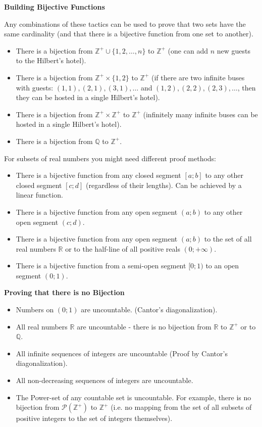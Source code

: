 \documentclass[jou]{apa6}
\begin{document}
{\bf Building Bijective Functions}

Any combinations of these tactics can be used
to prove that two sets have the same cardinality
(and that there is a bijective function from one set to another).

\begin{itemize}
\item There is a bijection from $\mathbb{Z}^{+} \cup \{ 1,2,\ldots,n \}$
to $\mathbb{Z}^{+}$ (one can add $n$ new guests to the Hilbert's hotel). 
\item There is a bijection from $\mathbb{Z}^{+} \times \{ 1,2 \}$
to $\mathbb{Z}^{+}$ (if there are two infinite buses with guests: 
$(1,1),(2,1),(3,1),\ldots$ and $(1,2),(2,2),(2,3),\ldots$, 
then they can be hosted in a single Hilbert's hotel). 
\item There is a bijection from $\mathbb{Z}^{+} \times \mathbb{Z}^{+}$
to $\mathbb{Z}^{+}$ (infinitely many infinite buses can be hosted in a 
single Hilbert's hotel). 
\item There is a bijection from $\mathbb{Q}$ to $\mathbb{Z}^{+}$. 
\end{itemize}

For subsets of real numbers you might need different 
proof methods: 

\begin{itemize}
\item There is a bijective function from any closed 
segment $[a;b]$ to any other closed segment $[c;d]$ 
(regardless of their lengths). Can be achieved by a linear
function. 
\item There is a bijective function from any open 
segment $(a;b)$ to any other open segment $(c;d)$. 
\item There is a bijective function from any open 
segment $(a;b)$ to the set of all real numbers $\mathbb{R}$
or to the half-line of all positive reals $(0;+\infty)$. 
\item There is a bijective function from a 
semi-open segment $[0;1)$ to an open segment $(0;1)$. 
\end{itemize}


{\bf Proving that there is no Bijection}

\begin{itemize}
\item Numbers on $(0;1)$ are uncountable. (Cantor's diagonalization). 
\item All real numbers $\mathbb{R}$ are uncountable - there 
is no bijection from $\mathbb{R}$ to $\mathbb{Z}^{+}$ or
to $\mathbb{Q}$. 
\item All infinite sequences of integers are uncountable
(Proof by Cantor's diagonalization). 
\item All non-decreasing sequences of integers are uncountable. 
\item The Power-set of any countable set is 
uncountable. For example, 
there is no bijection from $\mathcal{P}(\mathbb{Z}^{+})$
to $\mathbb{Z}^{+}$ (i.e. no mapping from the set of all subsets of 
positive integers to the set of integers themselves).
\end{itemize}
\end{document}
